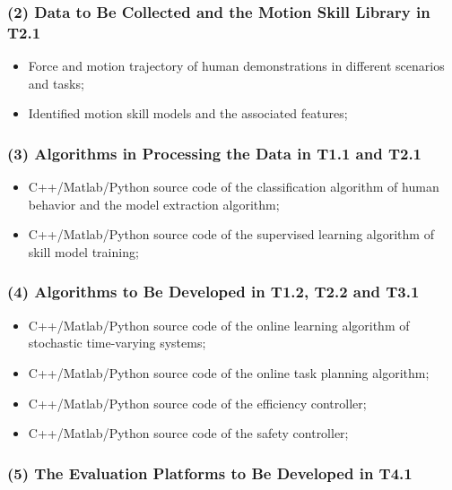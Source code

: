 \subsubsection*{(2) Data to Be Collected and the Motion Skill Library in T2.1}
\begin{itemize} \itemsep0pt \parskip0pt 
\item Force and motion trajectory of human demonstrations in different scenarios and tasks;
\item Identified motion skill models and the associated features;
\end{itemize}
\vspace{-10pt}

\subsubsection*{(3) Algorithms in Processing the Data in T1.1 and T2.1}
\begin{itemize} \itemsep0pt \parskip0pt 
\item C++/Matlab/Python source code of the classification algorithm of human behavior and the model extraction algorithm;
\item C++/Matlab/Python source code of the supervised learning algorithm of skill model training;
\end{itemize}
\vspace{-10pt}

\subsubsection*{(4) Algorithms to Be Developed in T1.2, T2.2 and T3.1}

\begin{itemize} \itemsep0pt \parskip0pt 
\item C++/Matlab/Python source code of the online learning algorithm of stochastic time-varying systems;
\item C++/Matlab/Python source code of the online task planning algorithm;
\item C++/Matlab/Python source code of the efficiency controller;
\item C++/Matlab/Python source code of the safety controller;
\end{itemize}

\vspace{-10pt}

\subsubsection*{(5) The Evaluation Platforms to Be Developed in T4.1}

